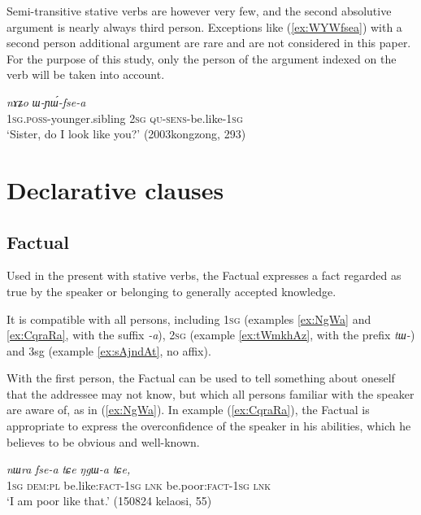 \documentclass[oldfontcommands,oneside,a4paper,11pt]{article}
\newcommand{\ipa}[1]{{\phon\textit{#1}}} %
\newcommand{\refb}[1]{(\ref{#1})}
\begin{document}
Semi-transitive stative verbs are however very few, and the second absolutive argument is nearly always third person. Exceptions like \refb{ex:WYWfsea} with a second person additional argument are rare and are not considered in this paper. For the purpose of this study, only the person of the argument indexed on the verb will be taken into account.


\begin{exe}
\ex \label{ex:WYWfsea}
\gll \ipa{a-ʁi,} 	\ipa{nɤʑo} 	\ipa{ɯ-ɲɯ́-fse-a} \\
\textsc{1sg.poss}-younger.sibling \textsc{2sg} \textsc{qu-sens}-be.like-\textsc{1sg} \\
\glt `Sister, do I look like you?' (2003kongzong, 293)
\end{exe}

\section{Declarative clauses}


\subsection{Factual}

Used in the present with stative verbs, the Factual expresses a fact regarded as true by the speaker or belonging to generally accepted knowledge. 

It is compatible with all persons, including \textsc{1sg} (examples \ref{ex:NgWa} and \ref{ex:CqraRa}, with the suffix \ipa{-a}), \textsc{2sg} (example \ref{ex:tWmkhAz}, with the prefix \ipa{tɯ-}) and 3sg (example \ref{ex:sAjndAt}, no affix).

With the first person, the Factual can be used to tell something about oneself that the addressee may not know, but which all persons familiar with the speaker are aware of, as in \refb{ex:NgWa}. In example \refb{ex:CqraRa}, the Factual is appropriate to express the overconfidence of the speaker in his abilities, which he believes to be obvious and well-known.

\begin{exe}
\ex \label{ex:NgWa}
\gll \ipa{aʑo} 	\ipa{nɯra} 	\ipa{fse-a} 	\ipa{tɕe} 	\ipa{ŋgɯ-a} 	\ipa{tɕe,} \\
\textsc{1sg} \textsc{dem:pl} be.like:\textsc{fact-1sg} \textsc{lnk} be.poor:\textsc{fact-1sg} \textsc{lnk} \\
\glt `I am poor like that.' (150824 kelaosi, 55)
\end{exe}
\end{document}
